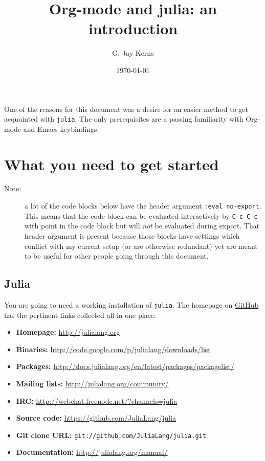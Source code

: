 \documentclass[11pt]{article}
\author{G. Jay Kerns}
\date{\today}
\title{Org-mode and julia: an introduction}
\begin{document}
\maketitle
\tableofcontents

One of the reasons for this document was a desire for an easier method to get acquainted with \texttt{julia}.  The only prerequisites are a passing familiarity with Org-mode and Emacs keybindings.

\newpage

\section[What you need to get started]{What you need to get started}
\label{sec-1}

\begin{description}
\item[Note:] a lot of the code blocks below have the header argument \texttt{:eval no-export}.  This means that the code block can be evaluated interactively by \texttt{C-c C-c} with point in the code block but will \emph{not} be evaluated during export.  That header argument is present because those blocks have settings which conflict with my current setup (or are otherwise redundant) yet are meant to be useful for other people going through this document.
\end{description}

\subsection[Julia]{Julia}
\label{sec-1-1}

You are going to need a working installation of \texttt{julia}.  The homepage on \href{https://github.com/JuliaLang/julia}{GitHub} has the pertinent links collected all in one place:

\begin{itemize}
\item \textbf{Homepage:} \url{http://julialang.org}
\item \textbf{Binaries:} \url{http://code.google.com/p/julialang/downloads/list}
\item \textbf{Packages:} \url{http://docs.julialang.org/en/latest/packages/packagelist/}
\item \textbf{Mailing lists:} \url{http://julialang.org/community/}
\item \textbf{IRC:} \url{http://webchat.freenode.net/?channels=julia}
\item \textbf{Source code:} \url{https://github.com/JuliaLang/julia}
\item \textbf{Git clone URL:} \texttt{git://github.com/JuliaLang/julia.git}
\item \textbf{Documentation:} \url{http://julialang.org/manual/}
\end{itemize}
\end{document}
